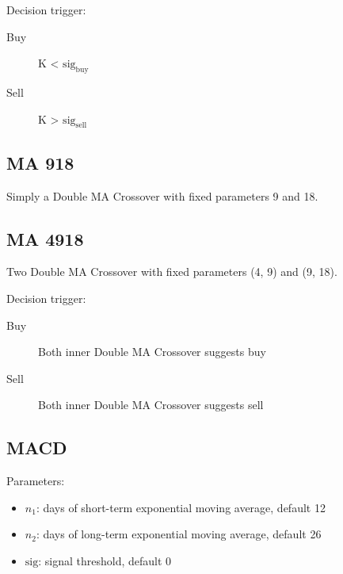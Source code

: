 \documentclass{article}
\begin{document}
Decision trigger:
\begin{description}
    \item[Buy] K < $\text{sig}_{\text{buy}}$
    \item[Sell] K > $\text{sig}_{\text{sell}}$
\end{description}

\subsection{MA 918}

Simply a Double MA Crossover with fixed parameters 9 and 18\cite{genetic-algorithms-for-predicting-the-egyptian-stock-market}.

\subsection{MA 4918}

Two Double MA Crossover with fixed parameters (4, 9) and (9, 18)\cite{genetic-algorithms-for-predicting-the-egyptian-stock-market}.

Decision trigger:
\begin{description}
    \item[Buy] Both inner Double MA Crossover suggests buy
    \item[Sell] Both inner Double MA Crossover suggests sell
\end{description}

\subsection{MACD}

Parameters\cite{stock-market-prediction-model-using-TPWS}:
\begin{itemize}
    \item $n_1$: days of short-term exponential moving average, default 12
    \item $n_2$: days of long-term exponential moving average, default 26
    \item $\text{sig}$: signal threshold, default 0
\end{itemize}
\end{document}
